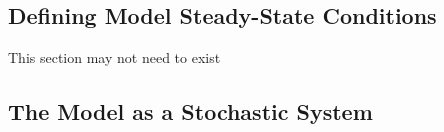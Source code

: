 \documentclass[11pt, a4paper]{article}
\begin{document}
\subsection{Defining Model Steady-State Conditions}
This section may not need to exist


\clearpage
\subsection{The Model as a Stochastic System}


{}

\end{document}
